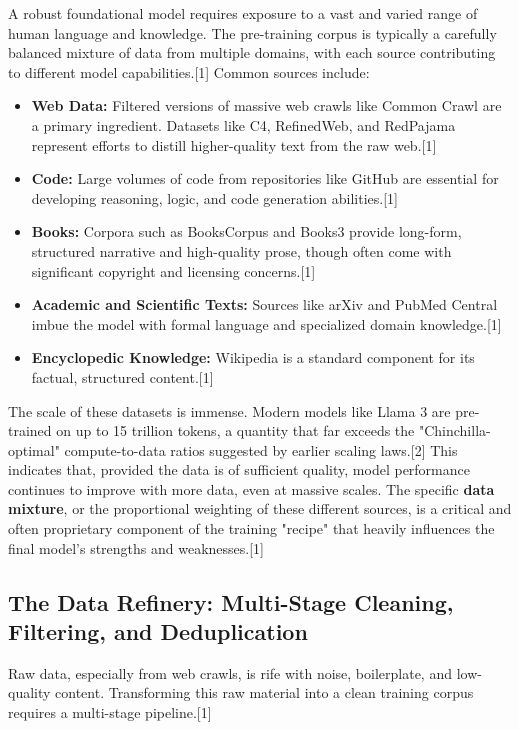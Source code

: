 \documentclass[12pt, a4paper]{article}
\begin{document}
A robust foundational model requires exposure to a vast and varied range of human language and knowledge. The pre-training corpus is typically a carefully balanced mixture of data from multiple domains, with each source contributing to different model capabilities.[1] Common sources include:

\begin{itemize}
    \item \textbf{Web Data:} Filtered versions of massive web crawls like Common Crawl are a primary ingredient. Datasets like C4, RefinedWeb, and RedPajama represent efforts to distill higher-quality text from the raw web.[1]
    \item \textbf{Code:} Large volumes of code from repositories like GitHub are essential for developing reasoning, logic, and code generation abilities.[1]
    \item \textbf{Books:} Corpora such as BooksCorpus and Books3 provide long-form, structured narrative and high-quality prose, though often come with significant copyright and licensing concerns.[1]
    \item \textbf{Academic and Scientific Texts:} Sources like arXiv and PubMed Central imbue the model with formal language and specialized domain knowledge.[1]
    \item \textbf{Encyclopedic Knowledge:} Wikipedia is a standard component for its factual, structured content.[1]
\end{itemize}

The scale of these datasets is immense. Modern models like Llama 3 are pre-trained on up to 15 trillion tokens, a quantity that far exceeds the "Chinchilla-optimal" compute-to-data ratios suggested by earlier scaling laws.[2] This indicates that, provided the data is of sufficient quality, model performance continues to improve with more data, even at massive scales. The specific \textbf{data mixture}, or the proportional weighting of these different sources, is a critical and often proprietary component of the training "recipe" that heavily influences the final model's strengths and weaknesses.[1]

\subsection{The Data Refinery: Multi-Stage Cleaning, Filtering, and Deduplication}

Raw data, especially from web crawls, is rife with noise, boilerplate, and low-quality content. Transforming this raw material into a clean training corpus requires a multi-stage pipeline.[1]
\end{document}
